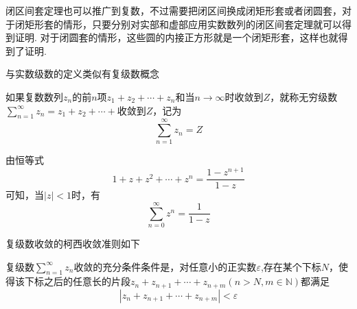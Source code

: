 闭区间套定理也可以推广到复数，不过需要把闭区间换成闭矩形套或者闭圆套，对于闭矩形套的情形，只要分别对实部和虚部应用实数数列的闭区间套定理就可以得到证明. 对于闭圆套的情形，这些圆的内接正方形就是一个闭矩形套，这样也就得到了证明.

与实数级数的定义类似有复级数概念
\begin{definition}
如果复数数列$z_n$的前$n$项$z_1+z_2+\cdots+z_n$和当$n\to\infty$时收敛到$Z$，就称无穷级数$\sum_{n=1}^{\infty}z_n=z_1+z_2+\cdots+$收敛到$Z$，记为
\[ \sum_{n=1}^{\infty}z_n=Z \]
\end{definition}

\begin{example}
  由恒等式
  \[ 1+z+z^2+\cdots+z^n = \frac{1-z^{n+1}}{1-z} \]
  可知，当$|z|<1$时，有
  \[ \sum_{n=0}^{\infty}z^n = \frac{1}{1-z} \]
\end{example}

复级数收敛的柯西收敛准则如下
\begin{theorem}
  复级数$\sum_{n=1}^{\infty}z_n$收敛的充分条件条件是，对任意小的正实数$\varepsilon$,存在某个下标$N$，使得该下标之后的任意长的片段$z_n+z_{n+1}+\cdots+z_{n+m}(n>N, m \in \mathbb{N})$都满足
  \[ |z_n+z_{n+1}+\cdots+z_{n+m}| < \varepsilon \]
\end{theorem}

